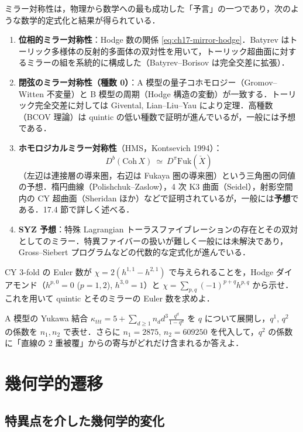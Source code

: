 ミラー対称性は，物理から数学への最も成功した「予言」の一つであり，次のような数学的定式化と結果が得られている．
\begin{enumerate}
\item \textbf{位相的ミラー対称性}：Hodge 数の関係 \eqref{eq:ch17-mirror-hodge}．Batyrev はトーリック多様体の反射的多面体の双対性を用いて，トーリック超曲面に対するミラーの組を系統的に構成した（Batyrev--Borisov は完全交差に拡張）．
\item \textbf{閉弦のミラー対称性（種数 0）}：A 模型の量子コホモロジー（Gromov--Witten 不変量）と B 模型の周期（Hodge 構造の変動）が一致する．トーリック完全交差に対しては Givental, Lian--Liu--Yau により定理．高種数（BCOV 理論）は quintic の低い種数で証明が進んでいるが，一般には予想である．
\item \textbf{ホモロジカルミラー対称性}（HMS，Kontsevich 1994）：
\[
D^b(\mathrm{Coh}\,X)\ \simeq\ D^\pi\mathrm{Fuk}(\check X)
\]
（左辺は連接層の導来圏，右辺は Fukaya 圏の導来圏）という三角圏の同値の予想．楕円曲線（Polishchuk--Zaslow），4 次 K3 曲面（Seidel），射影空間内の CY 超曲面（Sheridan ほか）などで証明されているが，一般には\textbf{予想}である．17.4 節で詳しく述べる．
\item \textbf{SYZ 予想}：特殊 Lagrangian トーラスファイブレーションの存在とその双対としてのミラー．特異ファイバーの扱いが難しく一般には未解決であり，Gross--Siebert プログラムなどの代数的な定式化が進んでいる．
\end{enumerate}

CY 3-fold の Euler 数が $\chi=2(h^{1,1}-h^{2,1})$ で与えられることを，Hodge ダイアモンド（$h^{p,0}=0$ ($p=1,2$), $h^{3,0}=1$）と $\chi=\sum_{p,q}(-1)^{p+q}h^{p,q}$ から示せ．これを用いて quintic とそのミラーの Euler 数を求めよ．

A 模型の Yukawa 結合 $\kappa_{ttt}=5+\sum_{d\ge1}n_dd^3\frac{q^d}{1-q^d}$ を $q$ について展開し，$q^1$, $q^2$ の係数を $n_1,n_2$ で表せ．さらに $n_1=2875$, $n_2=609250$ を代入して，$q^2$ の係数に「直線の 2 重被覆」からの寄与がどれだけ含まれるか答えよ．

\section{幾何学的遷移}

\subsection{特異点を介した幾何学的変化}

